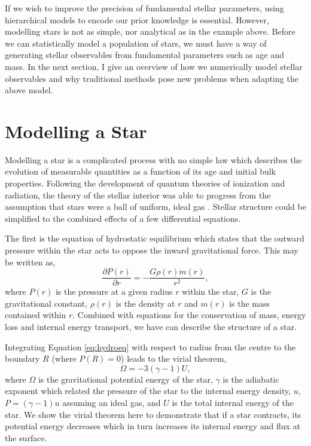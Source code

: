 If we wish to improve the precision of fundamental stellar parameters, using hierarchical models to encode our prior knowledge is essential. However, modelling stars is not as simple, nor analytical as in the example above. Before we can statistically model a population of stars, we must have a way of generating stellar observables from fundamental parameters such as age and mass. In the next section, I give an overview of how we numerically model stellar observables and why traditional methods pose new problems when adapting the above model.

\section{Modelling a Star}\label{sec:models}

Modelling a star is a complicated process with no simple law which describes the evolution of measurable quantities as a function of its age and initial bulk properties. Following the development of quantum theories of ionization and radiation, the theory of the stellar interior was able to progress from the assumption that stars were a ball of uniform, ideal gas \citet{Eddington1926}. Stellar structure could be simplified to the combined effects of a few differential equations.

The first is the equation of hydrostatic equilibrium which states that the outward pressure within the star acts to oppose the inward gravitational force. This may be written as,
\begin{equation}
    \frac{\partial P(r)}{\partial r}=-\frac{G \rho(r) m(r)}{r^{2}},\label{eq:hydroeq}
\end{equation}
where $P(r)$ is the pressure at a given radius $r$ within the star, $G$ is the gravitational constant, $\rho(r)$ is the density at $r$ and $m(r)$ is the mass contained within $r$. Combined with equations for the conservation of mass, energy loss and internal energy transport, we have can describe the structure of a star.

Integrating Equation \ref{eq:hydroeq} with respect to radius from the centre to the boundary $R$ (where $P(R)=0$) leads to the virial theorem,
\begin{equation}
    \Omega = - 3(\gamma - 1) U,
\end{equation}
where $\Omega$ is the gravitational potential energy of the star, $\gamma$ is the adiabatic exponent which related the pressure of the star to the internal energy density, $u$, $P = (\gamma - 1) u$ assuming an ideal gas, and $U$ is the total internal energy of the star. We show the virial theorem here to demonstrate that if a star contracts, its potential energy decreases which in turn increases its internal energy and flux at the surface.

